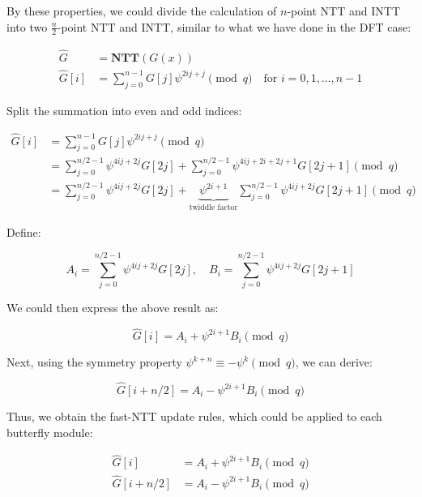 \documentclass[12pt]{article}
\begin{document}
By these properties, 
we could divide the calculation of $n$-point NTT and INTT into two $\frac{n}{2}$-point NTT and INTT, 
similar to what we have done in the DFT case:

\begin{align*}
    \hat{G} &= \mathbf{NTT}(G(x)) \\
    \hat{G}[i]  &= \sum_{j = 0}^{n - 1} G[j] \psi^{2ij + j} \pmod{q} \quad \text{for } i = 0, 1, \ldots, n-1
\end{align*}

Split the summation into even and odd indices:

\begin{align*}
    \hat{G}[i] 
    &= \sum_{j = 0}^{n - 1} G[j] \psi^{2ij + j} \pmod{q} \\
    &= \sum_{j = 0}^{n/2 - 1} \psi^{4ij + 2j} G[2j] + \sum_{j = 0}^{n/2 - 1} \psi^{4ij + 2i + 2j + 1} G[2j+1] \pmod{q} \\
    &= \sum_{j = 0}^{n/2 - 1} \psi^{4ij + 2j} G[2j] + \underbrace{\psi^{2i + 1}}_{\text{twiddle factor}}\sum_{j = 0}^{n/2 - 1} \psi^{4ij + 2j} G[2j+1] \pmod{q}
\end{align*}

Define:

\begin{equation*}
    A_i = \sum_{j = 0}^{n/2 - 1} \psi^{4ij + 2j} G[2j], \quad B_i = \sum_{j = 0}^{n/2 - 1} \psi^{4ij + 2j} G[2j+1]
\end{equation*}

We could then express the above result as:

\begin{equation*}
    \hat{G}[i] = A_i + \psi^{2i + 1} B_i \pmod{q}
\end{equation*}

Next, using the symmetry property $\psi^{k + n} \equiv -\psi^k \pmod{q}$, we can derive:

\begin{equation*}
    \hat{G}[i + n/2] = A_i - \psi^{2i + 1} B_i \pmod{q}
\end{equation*}

Thus, we obtain the fast-NTT update rules, which could be applied to each butterfly module:

\begin{align*}
    \hat{G}[i] &= A_i + \psi^{2i + 1} B_i \pmod{q} \\
    \hat{G}[i + n/2] &= A_i - \psi^{2i + 1} B_i \pmod{q}
\end{align*}
\end{document}
